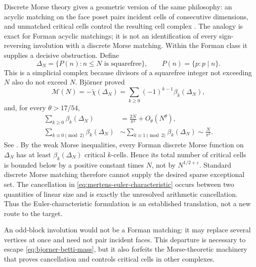 \documentclass[11pt]{amsart}
\numberwithin{equation}{section}
\theoremstyle{plain}
\theoremstyle{definition}
\theoremstyle{remark}
\newcommand{\Mertens}{\mathcal M}
\newcommand{\eps}{\varepsilon}
\begin{document}
Discrete Morse theory gives a geometric version of the same philosophy:
an acyclic matching on the face poset pairs incident cells of consecutive
dimensions, and unmatched critical cells control the resulting cell complex
\cite{Forman1998}.  The analogy is exact for Forman acyclic matchings; it is
not an identification of every sign-reversing involution with a discrete Morse
matching.  Within the Forman class it supplies a decisive obstruction.
Define
\begin{equation}
  \Delta_N=\{P(n):n\leq N\text{ is squarefree}\},
  \qquad
  P(n)=\{p:p\mid n\}.
  \label{eq:bjorner-complex}
\end{equation}
This is a simplicial complex because divisors of a squarefree integer not
exceeding \(N\) also do not exceed \(N\).  Bj\"orner proved
\begin{equation}
  \Mertens(N)=-\widetilde\chi(\Delta_N)
  =\sum_{k\geq0}(-1)^{k-1}\beta_k(\Delta_N),
  \label{eq:mertens-euler-characteristic}
\end{equation}
and, for every \(\theta>17/54\),
\begin{equation}
\begin{aligned}
  \sum_{k\geq0}\beta_k(\Delta_N)
    &=\frac{2N}{\pi^2}+O_{\theta}(N^{\theta}),\\
  \sum_{k\equiv 0 \pmod 2}\beta_k(\Delta_N)
    &\sim
    \sum_{k\equiv 1 \pmod 2}\beta_k(\Delta_N)
    \sim\frac{N}{\pi^2}.
\end{aligned}
  \label{eq:bjorner-betti-mass}
\end{equation}
See \cite{Bjorner2011}.  By the weak Morse inequalities, every Forman discrete
Morse function on \(\Delta_N\) has at least \(\beta_k(\Delta_N)\) critical
\(k\)-cells.  Hence its total number of critical cells is bounded below by a
positive constant times \(N\), not by \(N^{1/2+\eps}\).  Standard discrete
Morse matching therefore cannot supply the desired sparse exceptional set.
The cancellation in \eqref{eq:mertens-euler-characteristic} occurs between two
quantities of linear size and is exactly the unresolved arithmetic
cancellation.  Thus the Euler-characteristic formulation is an established
translation, not a new route to the target.

An odd-block involution would not be a Forman matching: it may replace several
vertices at once and need not pair incident faces.  This departure is necessary
to escape \eqref{eq:bjorner-betti-mass}, but it also forfeits the Morse-theoretic
machinery that proves cancellation and controls critical cells in other
complexes.
\end{document}
